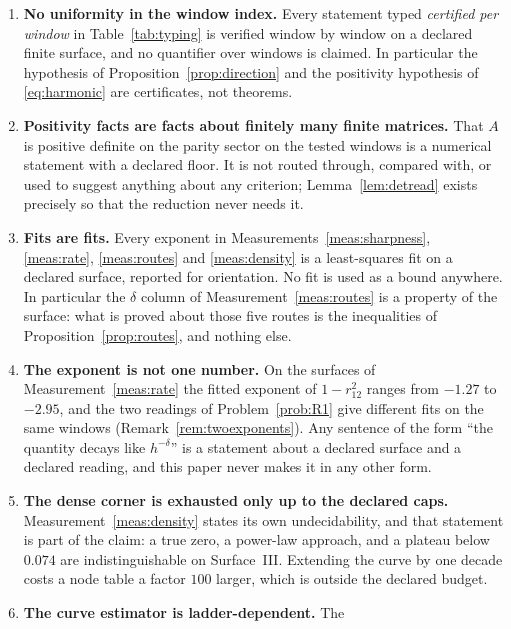\documentclass[11pt,a4paper]{article}
\theoremstyle{plain}
\theoremstyle{definition}
\begin{document}
\begin{enumerate}[label=\textup{(L\arabic*)},leftmargin=3.2em]
\item\label{L:uniform} \textbf{No uniformity in the window index.} Every
  statement typed \emph{certified per window} in Table~\ref{tab:typing} is
  verified window by window on a declared finite surface, and no quantifier over
  windows is claimed. In particular the hypothesis of
  Proposition~\ref{prop:direction} and the positivity hypothesis of
  \eqref{eq:harmonic} are certificates, not theorems.
\item\label{L:positivity} \textbf{Positivity facts are facts about finitely
  many finite matrices.} That $A$ is positive definite on the parity sector on
  the tested windows is a numerical statement with a declared floor. It is not
  routed through, compared with, or used to suggest anything about any
  criterion; Lemma~\ref{lem:detread} exists precisely so that the reduction
  never needs it.
\item\label{L:fits} \textbf{Fits are fits.} Every exponent in
  Measurements~\ref{meas:sharpness}, \ref{meas:rate}, \ref{meas:routes} and
  \ref{meas:density} is a least-squares fit on a declared surface, reported for
  orientation. No fit is used as a bound anywhere. In particular the $\delta$
  column of Measurement~\ref{meas:routes} is a property of the surface: what is
  proved about those five routes is the inequalities of
  Proposition~\ref{prop:routes}, and nothing else.
\item\label{L:exponent} \textbf{The exponent is not one number.} On the
  surfaces of Measurement~\ref{meas:rate} the fitted exponent of
  $1-r_{12}^{2}$ ranges from $-1.27$ to $-2.95$, and the two readings of
  Problem~\ref{prob:R1} give different fits on the same windows
  (Remark~\ref{rem:twoexponents}). Any sentence of the form ``the quantity
  decays like $h^{-\delta}$'' is a statement about a declared surface and a
  declared reading, and this paper never makes it in any other form.
\item\label{L:corner} \textbf{The dense corner is exhausted only up to the
  declared caps.} Measurement~\ref{meas:density} states its own
  undecidability, and that statement is part of the claim: a true zero, a
  power-law approach, and a plateau below $0.074$ are indistinguishable on
  Surface~III. Extending the curve by one decade costs a node table a factor
  $100$ larger, which is outside the declared budget.
\item\label{L:ladder} \textbf{The curve estimator is ladder-dependent.} The

\end{enumerate}
\end{document}
